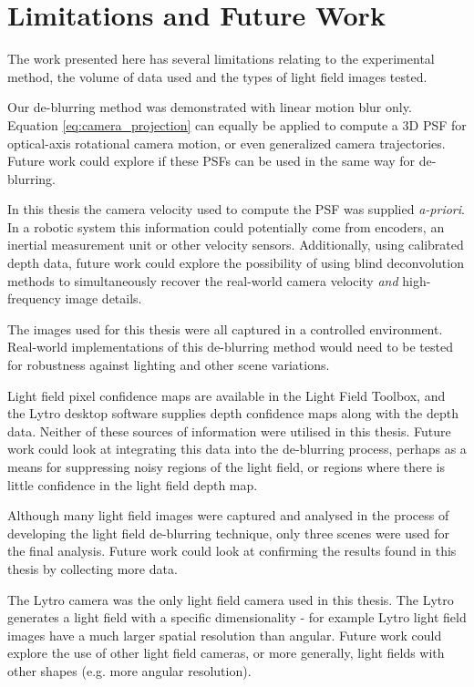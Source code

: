 \section{Limitations and Future Work}
\label{sec:limitations_and_future_work}

The work presented here has several limitations relating to the experimental method, the volume of data used and the types of light field images tested.

Our de-blurring method was demonstrated with linear motion blur only.
Equation \ref{eq:camera_projection} can equally be applied to compute a 3D PSF for optical-axis rotational camera motion, or even generalized camera trajectories.
Future work could explore if these PSFs can be used in the same way for de-blurring.

In this thesis the camera velocity used to compute the PSF was supplied \emph{a-priori}.
In a robotic system this information could potentially come from encoders, an inertial measurement unit or other velocity sensors.
Additionally, using calibrated depth data, future work could explore the possibility of using blind deconvolution methods to simultaneously recover the real-world camera velocity \emph{and} high-frequency image details.

The images used for this thesis were all captured in a controlled environment.
Real-world implementations of this de-blurring method would need to be tested for robustness against lighting and other scene variations.

Light field pixel confidence maps are available in the Light Field Toolbox, and the Lytro desktop software supplies depth confidence maps along with the depth data.
Neither of these sources of information were utilised in this thesis.
Future work could look at integrating this data into the de-blurring process, perhaps as a means for suppressing noisy regions of the light field, or regions where there is little confidence in the light field depth map.

Although many light field images were captured and analysed in the process of developing the light field de-blurring technique, only three scenes were used for the final analysis.
Future work could look at confirming the results found in this thesis by collecting more data.

The Lytro camera was the only light field camera used in this thesis.
The Lytro generates a light field with a specific dimensionality - for example Lytro light field images have a much larger spatial resolution than angular.
Future work could explore the use of other light field cameras, or more generally, light fields with other shapes (e.g. more angular resolution).

